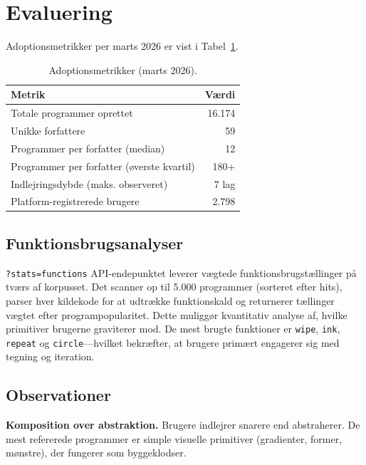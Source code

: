 \documentclass[10pt,letterpaper,twocolumn]{article}
\begin{document}

\section{Evaluering}
\label{sec:evaluation}

Adoptionsmetrikker per marts 2026 er vist i Tabel~\ref{tab:adoption}.

\begin{table}[h]
\small
\centering
\begin{tabular}{lr}
\toprule
\textbf{Metrik} & \textbf{Værdi} \\
\midrule
Totale programmer oprettet & 16.174 \\
Unikke forfattere & 59 \\
Programmer per forfatter (median) & 12 \\
Programmer per forfatter (øverste kvartil) & 180+ \\
Indlejringsdybde (maks. observeret) & 7 lag \\
Platform-registrerede brugere & 2.798 \\
\bottomrule
\end{tabular}
\caption{Adoptionsmetrikker (marts 2026).}
\label{tab:adoption}
\end{table}

\subsection{Funktionsbrugsanalyser}

\texttt{?stats=functions} API-endepunktet leverer vægtede funktionsbrugstællinger på tværs af korpusset. Det scanner op til 5.000 programmer (sorteret efter hits), parser hver kildekode for at udtrække funktionskald og returnerer tællinger vægtet efter programpopularitet. Dette muliggør kvantitativ analyse af, hvilke primitiver brugerne graviterer mod. De mest brugte funktioner er \texttt{wipe}, \texttt{ink}, \texttt{repeat} og \texttt{circle}---hvilket bekræfter, at brugere primært engagerer sig med tegning og iteration.

\subsection{Observationer}

\textbf{Komposition over abstraktion.} Brugere indlejrer snarere end abstraherer. De mest refererede programmer er simple visuelle primitiver (gradienter, former, mønstre), der fungerer som byggeklodser.
\end{document}
